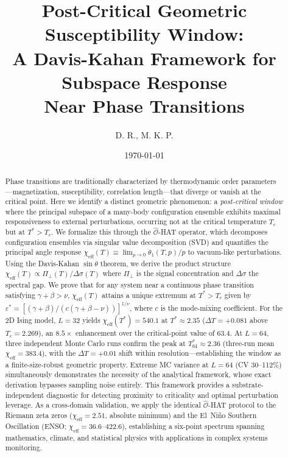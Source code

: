 \documentclass[aps,prl,twocolumn,superscriptaddress,byrevtex]{article}
\title{Post-Critical Geometric Susceptibility Window: \\
A Davis-Kahan Framework for Subspace Response \\
Near Phase Transitions}
\author{D. R., M. K. P.}
\date{\today}
\begin{document}
\maketitle

\begin{abstract}
Phase transitions are traditionally characterized by thermodynamic order parameters---magnetization, susceptibility, correlation length---that diverge or vanish at the critical point. Here we identify a distinct geometric phenomenon: a \emph{post-critical window} where the principal subspace of a many-body configuration ensemble exhibits maximal responsiveness to external perturbations, occurring not at the critical temperature $T_c$ but at $T^* > T_c$. We formalize this through the $\hat{\mathcal{O}}$-HAT operator, which decomposes configuration ensembles via singular value decomposition (SVD) and quantifies the principal angle response $\chi_{\text{eff}}(T) \equiv \lim_{p\to 0} \theta_1(T,p)/p$ to vacuum-like perturbations. Using the Davis-Kahan $\sin\theta$ theorem, we derive the product structure $\chi_{\text{eff}}(T) \propto \Pi_\perp(T)/\Delta\sigma(T)$ where $\Pi_\perp$ is the signal concentration and $\Delta\sigma$ the spectral gap. We prove that for any system near a continuous phase transition satisfying $\gamma + \beta > \nu$, $\chi_{\text{eff}}(T)$ attains a unique extremum at $T^* > T_c$ given by $\varepsilon^* = [(\gamma+\beta)/(c(\gamma+\beta-\nu))]^{1/\nu}$, where $c$ is the mode-mixing coefficient. For the 2D Ising model, $L=32$ yields $\chi_{\text{eff}}(T^*) = 540.1$ at $T^* \approx 2.35$ ($\Delta T = +0.081$ above $T_c = 2.269$), an $8.5\times$ enhancement over the critical-point value of $63.4$. At $L=64$, three independent Monte Carlo runs confirm the peak at $T^*_{64} \approx 2.36$ (three-run mean $\chi_{\text{eff}} = 383.4$), with the $\Delta T = +0.01$ shift within resolution---establishing the window as a finite-size-robust geometric property. Extreme MC variance at $L=64$ (CV 30--112\%) simultaneously demonstrates the necessity of the analytical framework, whose exact derivation bypasses sampling noise entirely. This framework provides a substrate-independent diagnostic for detecting proximity to criticality and optimal perturbation leverage. As a cross-domain validation, we apply the identical $\hat{\mathcal{O}}$-HAT protocol to the Riemann zeta zeros ($\chi_{\text{eff}} = 2.51$, absolute minimum) and the El~Ni\~{n}o Southern Oscillation (ENSO; $\chi_{\text{eff}} = 36.6$--$422.6$), establishing a six-point spectrum spanning mathematics, climate, and statistical physics with applications in complex systems monitoring.
\end{abstract}
\end{document}
